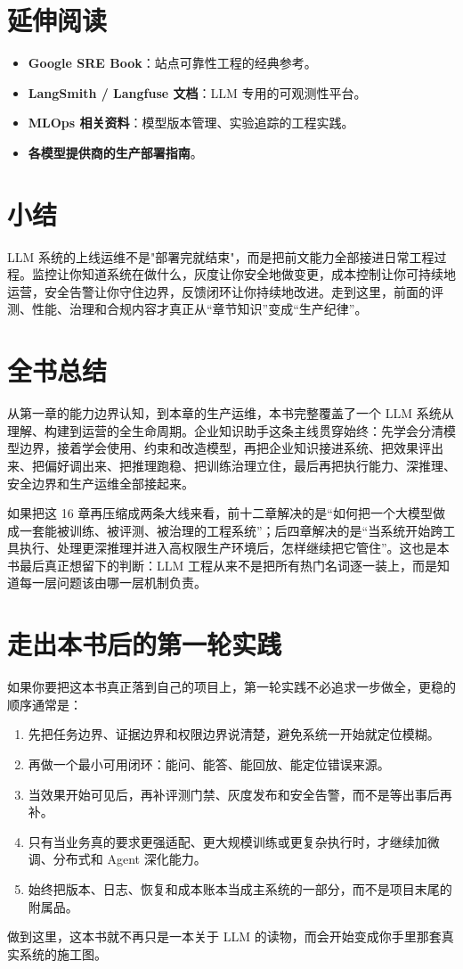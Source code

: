 \section{延伸阅读}
\begin{itemize}
  \item \textbf{Google SRE Book}：站点可靠性工程的经典参考。
  \item \textbf{LangSmith / Langfuse 文档}：LLM 专用的可观测性平台。
  \item \textbf{MLOps 相关资料}：模型版本管理、实验追踪的工程实践。
  \item \textbf{各模型提供商的生产部署指南}。
\end{itemize}

\section{小结}
LLM 系统的上线运维不是"部署完就结束"，而是把前文能力全部接进日常工程过程。监控让你知道系统在做什么，灰度让你安全地做变更，成本控制让你可持续地运营，安全告警让你守住边界，反馈闭环让你持续地改进。走到这里，前面的评测、性能、治理和合规内容才真正从“章节知识”变成“生产纪律”。

\section{全书总结}
从第一章的能力边界认知，到本章的生产运维，本书完整覆盖了一个 LLM 系统从理解、构建到运营的全生命周期。企业知识助手这条主线贯穿始终：先学会分清模型边界，接着学会使用、约束和改造模型，再把企业知识接进系统、把效果评出来、把偏好调出来、把推理跑稳、把训练治理立住，最后再把执行能力、深推理、安全边界和生产运维全部接起来。

如果把这 16 章再压缩成两条大线来看，前十二章解决的是“如何把一个大模型做成一套能被训练、被评测、被治理的工程系统”；后四章解决的是“当系统开始跨工具执行、处理更深推理并进入高权限生产环境后，怎样继续把它管住”。这也是本书最后真正想留下的判断：LLM 工程从来不是把所有热门名词逐一装上，而是知道每一层问题该由哪一层机制负责。

\section{走出本书后的第一轮实践}
如果你要把这本书真正落到自己的项目上，第一轮实践不必追求一步做全，更稳的顺序通常是：
\begin{enumerate}
  \item 先把任务边界、证据边界和权限边界说清楚，避免系统一开始就定位模糊。
  \item 再做一个最小可用闭环：能问、能答、能回放、能定位错误来源。
  \item 当效果开始可见后，再补评测门禁、灰度发布和安全告警，而不是等出事后再补。
  \item 只有当业务真的要求更强适配、更大规模训练或更复杂执行时，才继续加微调、分布式和 Agent 深化能力。
  \item 始终把版本、日志、恢复和成本账本当成主系统的一部分，而不是项目末尾的附属品。
\end{enumerate}

做到这里，这本书就不再只是一本关于 LLM 的读物，而会开始变成你手里那套真实系统的施工图。
